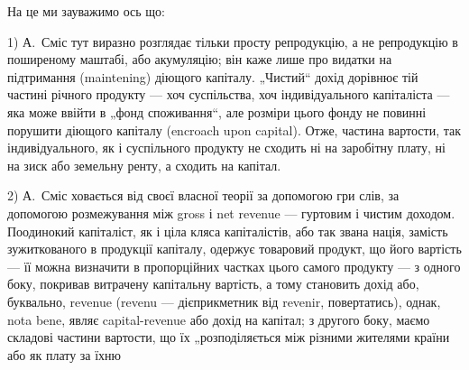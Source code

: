 На це ми зауважимо ось що:

1) А.~Сміс тут виразно розглядає тільки просту репродукцію, а не
репродукцію в поширеному маштабі, або акумуляцію; він каже лише про
видатки на підтримання (maintening) діющого капіталу. „Чистий“ дохід
дорівнює тій частині річного продукту — хоч суспільства, хоч індивідуального
капіталіста — яка може ввійти в „фонд споживання“, але розміри
цього фонду не повинні порушити діющого капіталу (encroach upon capital).
Отже, частина вартости, так індивідуального, як і суспільного продукту
не сходить ні на заробітну плату, ні на зиск або земельну ренту,
а сходить на капітал.

2) А.~Сміс ховається від своєї власної теорії за допомогою гри слів,
за допомогою розмежування між gross і net revenue — гуртовим і чистим
доходом. Поодинокий капіталіст, як і ціла кляса капіталістів, або так
звана нація, замість зужиткованого в продукції капіталу, одержує товаровий
продукт, що його вартість — її можна визначити в пропорційних частках
цього самого продукту — з одного боку, покривав витрачену капітальну
вартість, а тому становить дохід або, буквально, revenue (revenu — дієприкметник
від revenir, повертатись), однак, nota bene, являє capital-revenue або
дохід на капітал; з другого боку, маємо складові частини вартости, що
їх „розподіляється між різними жителями країни або як плату за їхню
\parbreak{}  %
